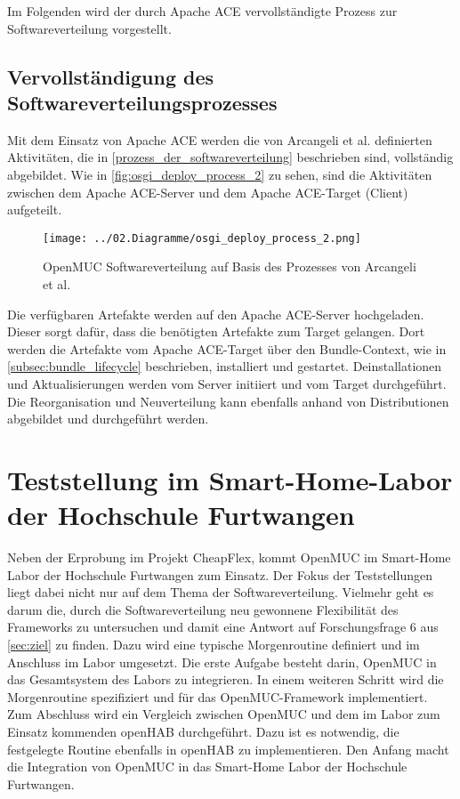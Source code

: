 Im Folgenden wird der durch Apache ACE vervollständigte Prozess zur Softwareverteilung vorgestellt.


\subsection{Vervollständigung des Softwareverteilungsprozesses}

Mit dem Einsatz von Apache ACE werden die von Arcangeli et al. \cite{sw_dist} definierten Aktivitäten, die in \autoref{prozess_der_softwareverteilung} beschrieben sind, vollständig abgebildet.
Wie in \autoref{fig:osgi_deploy_process_2} zu sehen, sind die Aktivitäten zwischen dem Apache ACE-Server und dem Apache ACE-Target (Client) aufgeteilt. 

\begin{figure}[h]
 \centering
 \texttt{[image: ../02.Diagramme/osgi\_deploy\_process\_2.png]}
 \caption{OpenMUC Softwareverteilung auf Basis des Prozesses von Arcangeli et al. \cite{sw_dist}}
 \label{fig:osgi_deploy_process_2}
\end{figure}

Die verfügbaren Artefakte werden auf den Apache ACE-Server hochgeladen.
Dieser sorgt dafür, dass die benötigten Artefakte zum Target gelangen. 
Dort werden die Artefakte vom Apache ACE-Target über den Bundle-Context, wie in \autoref{subsec:bundle_lifecycle} beschrieben, installiert und gestartet.
Deinstallationen und Aktualisierungen werden vom Server initiiert und vom Target durchgeführt.
Die Reorganisation und Neuverteilung kann ebenfalls anhand von Distributionen abgebildet und durchgeführt werden.


\section{Teststellung im Smart-Home-Labor der Hochschule Furtwangen}
\label{sec:testing_shlab}

Neben der Erprobung im Projekt CheapFlex, kommt OpenMUC im Smart-Home Labor der Hochschule Furtwangen zum Einsatz.
Der Fokus der Teststellungen liegt dabei nicht nur auf dem Thema der Softwareverteilung.
Vielmehr geht es darum die, durch die Softwareverteilung neu gewonnene Flexibilität des Frameworks zu untersuchen und damit eine Antwort auf Forschungsfrage 6 
aus \autoref{sec:ziel} zu finden. Dazu wird eine typische Morgenroutine definiert und im Anschluss im Labor umgesetzt. 
Die erste Aufgabe besteht darin, OpenMUC in das Gesamtsystem des Labors zu integrieren. 
In einem weiteren Schritt wird die Morgenroutine spezifiziert und für das OpenMUC-Framework implementiert.
Zum Abschluss wird ein Vergleich zwischen OpenMUC und dem im Labor zum Einsatz kommenden openHAB durchgeführt.
Dazu ist es notwendig, die festgelegte Routine ebenfalls in openHAB zu implementieren.
Den Anfang macht die Integration von OpenMUC in das Smart-Home Labor der Hochschule Furtwangen.

